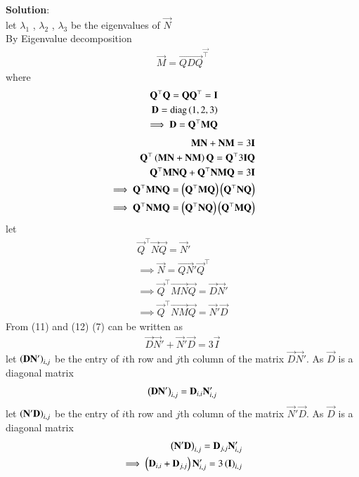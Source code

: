 \documentclass[journal]{IEEEtran}
\begin{document}
\textbf{Solution}:\\
let $\lambda_1$  , $\lambda_2$ , $\lambda_3$ be the eigenvalues of $\vec{N}$\\
By Eigenvalue decomposition
\begin{align}
    \vec{M}=\vec{QDQ}^\vec{\top}
\end{align}
where 
\begin{align}
    \mathbf{Q}^\top\mathbf{Q}=\mathbf{Q}\mathbf{Q}^\top=\mathbf{I}\\
    \mathbf{D}=\text{diag}\left(1,2 ,3\right)\\
    \implies \mathbf{D}=\mathbf{Q}^\top\mathbf{M}\mathbf{Q}
\end{align}
\begin{align}
    \mathbf{MN}+\mathbf{NM}=3\mathbf{I}\\
    \mathbf{Q}^\top\left( \mathbf{MN}+\mathbf{NM}\right)\mathbf{Q}=\mathbf{Q}^\top 3\mathbf{I}\mathbf{Q}\\
    \mathbf{Q}^\top\mathbf{MN}\mathbf{Q} + \mathbf{Q}^\top\mathbf{NM}\mathbf{Q}=3\mathbf{I}\\
  \implies  \mathbf{Q}^\top\mathbf{MN}\mathbf{Q}=\left(\mathbf{Q}^\top\mathbf{M}\mathbf{Q}\right)\left(\mathbf{Q}^\top\mathbf{N}\mathbf{Q}\right)\\
  \implies  \mathbf{Q}^\top\mathbf{NM}\mathbf{Q}=\left(\mathbf{Q}^\top\mathbf{N}\mathbf{Q}\right)\left(\mathbf{Q}^\top\mathbf{M}\mathbf{Q}\right)
\end{align}
let
\begin{align}
 \vec{Q}^\top\vec{N}\vec{Q}=\vec{N}'\\
 \implies \vec{N}=\vec{QN}'\vec{Q}^\top\\
 \implies \vec{Q}^\top\vec{MN}\vec{Q}=\vec{D}\vec{N}'\\
 \implies \vec{Q}^\top\vec{NM}\vec{Q}=\vec{N}'\vec{D}
\end{align}
From (11) and (12) (7) can be written as
\begin{align}
    \vec{D}\vec{N}' + \vec{N}'\vec{D}=3\vec{I}
\end{align}
let $\left(\mathbf{D}\mathbf{N}'\right)_{i,j}$ be the entry of $i$th row and $j$th column of the matrix $\vec{D}\vec{N}'$.  As $\vec{D}$ is a diagonal matrix
\begin{align}
    \left(\mathbf{D}\mathbf{N}'\right)_{i,j}=\mathbf{D}_{i,i}\mathbf{N}'_{i,j}
\end{align}
let $\left(\mathbf{N}'\mathbf{D}\right)_{i,j}$ be the entry of $i$th row and $j$th column of the matrix $\vec{N}'\vec{D}$.  As $\vec{D}$ is a diagonal matrix
\begin{align}
   \left(\mathbf{N}'\mathbf{D}\right)_{i,j}=\mathbf{D}_{j,j}\mathbf{N}'_{i,j}\\
     \implies \left(\mathbf{D}_{i,i} + \mathbf{D}_{j,j}\right)\mathbf{N}'_{i,j}=3\left(\mathbf{I}\right)_{i,j}
\end{align}
\end{document}
